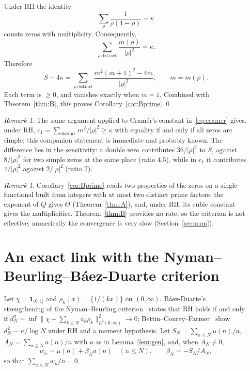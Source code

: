 \documentclass[11pt]{amsart}
\theoremstyle{remark}
\newtheorem{remark}[lemma]{Remark}
\theoremstyle{definition}
\begin{document}
Under RH the identity
\[
\sum_\rho\frac{1}{\rho(1-\rho)}=\kappa
\]
counts zeros with multiplicity. Consequently,
\[
\sum_{\rho\ \mathrm{distinct}}\frac{m(\rho)}{|\rho|^2}=\kappa.
\]
Therefore
\[
S-4\kappa=\sum_{\rho\ \mathrm{distinct}}\frac{m^2(m+1)^2-4m}{|\rho|^2},\qquad m=m(\rho).
\]
Each term is $\ge0$, and vanishes exactly when $m=1$. Combined with Theorem~\ref{thm:B}, this proves Corollary~\ref{cor:Bprime}.\qed

\begin{remark}\label{rem:twin}
The same argument applied to Cram\'er's constant in~\eqref{eq:cramer} gives, under RH, $c_1=\sum_{\mathrm{distinct}}m^2/|\rho|^2\ge\kappa$ with equality if and only if all zeros are simple; this companion statement is immediate and probably known. The difference lies in the sensitivity: a double zero contributes $36/|\rho|^2$ to $S$, against $8/|\rho|^2$ for two simple zeros at the same place (ratio $4.5$), while in $c_1$ it contributes $4/|\rho|^2$ against $2/|\rho|^2$ (ratio $2$).
\end{remark}

\begin{remark}
Corollary~\ref{cor:Bprime} reads two properties of the zeros on a single functional built from integers with at most two distinct prime factors: the exponent of $Q$ gives $\Theta$ (Theorem~\ref{thm:A}), and, under RH, its cubic constant gives the multiplicities. Theorem~\ref{thm:B} provides no rate, so the criterion is not effective; numerically the convergence is very slow (Section~\ref{sec:num}).
\end{remark}

\section{An exact link with the Nyman--Beurling--B\'aez-Duarte criterion}\label{sec:NB}

Let $\chi=\mathbf 1_{(0,1]}$ and $\rho_k(x)=\{1/(kx)\}$ on $(0,\infty)$. B\'aez-Duarte's strengthening of the Nyman--Beurling criterion~\cite{Nym50,Beu55,Bae03} states that RH holds if and only if $d_N^2=\inf\|\chi-\sum_{k\le N}a_k\rho_k\|^2_{L^2(0,\infty)}\to0$; Bettin--Conrey--Farmer~\cite{BCF13} show $d_N^2\sim\kappa/\log N$ under RH and a moment hypothesis. Let $S_N=\sum_{n\le N}\mu(n)/n$, $A_N=\sum_{n\le N}a(n)/n$ with $a$ as in Lemma~\ref{lem:gen}, and, when $A_N\ne0$,
\[
w_n=\mu(n)+\beta_Na(n)\quad(n\le N),\qquad\beta_N=-S_N/A_N,
\]
so that $\sum_{n\le N}w_n/n=0$.
\end{document}
